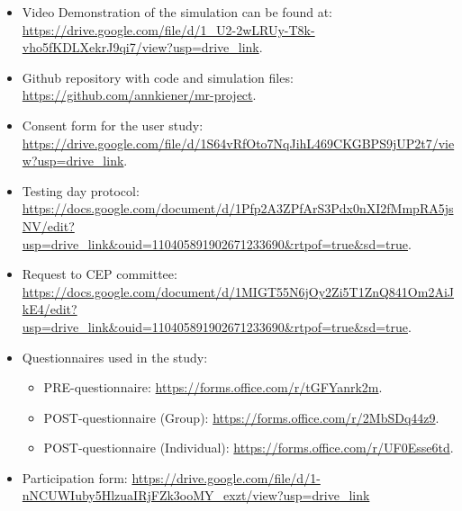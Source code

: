 \begin{itemize}

\item   Video Demonstration of the simulation can be found at: \url{https://drive.google.com/file/d/1_U2-2wLRUy-T8k-vho5fKDLXekrJ9qi7/view?usp=drive_link}.
\item Github repository with code and simulation files: \url{https://github.com/annkiener/mr-project}.
\item Consent form for the user study: \url{https://drive.google.com/file/d/1S64vRfOto7NqJihL469CKGBPS9jUP2t7/view?usp=drive_link}.
\item Testing day protocol: \url{https://docs.google.com/document/d/1Pfp2A3ZPfArS3Pdx0nXI2fMmpRA5jsNV/edit?usp=drive_link&ouid=110405891902671233690&rtpof=true&sd=true}.
\item Request to CEP committee: \url{https://docs.google.com/document/d/1MIGT55N6jOy2Zi5T1ZnQ841Om2AiJkE4/edit?usp=drive_link&ouid=110405891902671233690&rtpof=true&sd=true}.
\item Questionnaires used in the study:
    \begin{itemize}
        \item PRE-questionnaire: \url{https://forms.office.com/r/tGFYanrk2m}.
        \item POST-questionnaire (Group): \url{https://forms.office.com/r/2MbSDq44z9}.
        \item POST-questionnaire (Individual): \url{https://forms.office.com/r/UF0Esse6td}.

    \end{itemize}
\item Participation form: \url{https://drive.google.com/file/d/1-nNCUWIuby5HlzuaIRjFZk3ooMY_exzt/view?usp=drive_link}

\end{itemize}